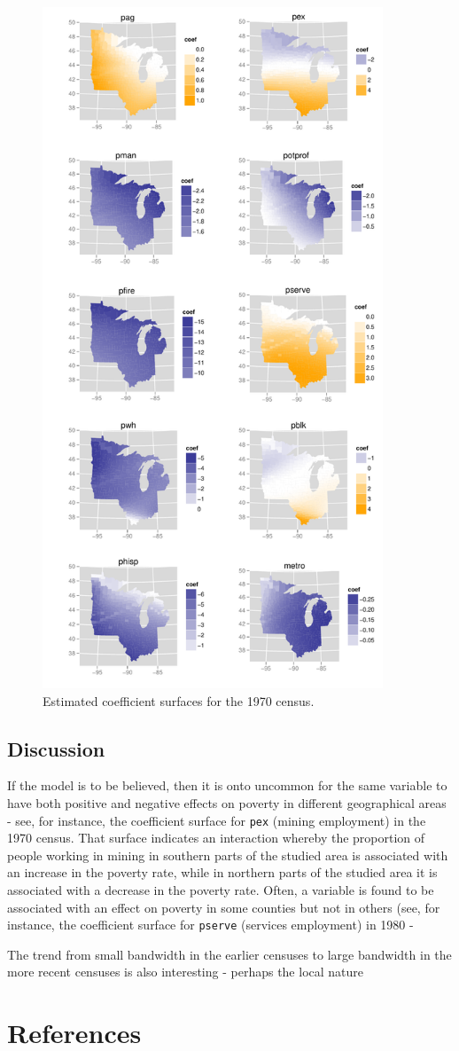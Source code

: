 \documentclass[authoryear, review, 11pt]{elsarticle}
\begin{document}
	\begin{figure}
		\begin{center}
			\includegraphics[height=8in]{../../figures/poverty/1970.linear.coefficients.pdf}
			\caption{Estimated coefficient surfaces for the 1970 census.\label{fig:census-coefs-1970}}
		\end{center}
	\end{figure}			
	\subsection{Discussion}
	If the model is to be believed, then it is onto uncommon for the same variable to have both positive and negative effects on poverty in different geographical areas - see, for instance, the coefficient surface for \verb!pex! (mining employment) in the 1970 census. That surface indicates an interaction whereby the proportion of people working in mining in southern parts of the studied area is associated with an increase in the poverty rate, while in northern parts of the studied area it is associated with a decrease in the poverty rate. Often, a variable is found to be associated with an effect on poverty in some counties but not in others (see, for instance, the coefficient surface for \verb!pserve! (services employment) in 1980 - 
	
	The trend from small bandwidth in the earlier censuses to large bandwidth in the more recent censuses is also interesting - perhaps the local nature 


\section{References}


\end{document}
